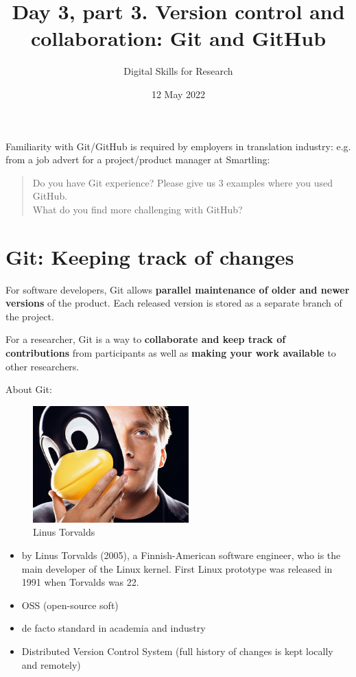 \documentclass[a4paper,11pt]{article}
\title{Day 3, part 3. Version control and collaboration: Git and GitHub}
\author{Digital Skills for Research}
\date{12 May 2022}
\begin{document}
	
	\clearpage
	\maketitle
	\thispagestyle{empty}
	
	\tableofcontents 

\section*{}

Familiarity with Git/GitHub is required by employers in translation industry:
e.g. from a job advert for a project/product manager at Smartling:
\begin{quotation}
	\noindent Do you have Git experience? Please give us 3 examples where you used GitHub.\\
	What do you find more challenging with GitHub?
\end{quotation}


\section{Git: Keeping track of changes}

For software developers, Git allows \textbf{parallel maintenance of older and newer versions} of the product. Each released version is stored as a separate branch of the project. 

For a researcher, Git is a way to \textbf{collaborate and keep track of contributions} from participants as well as \textbf{making your work available} to other researchers. 

\bigskip

About Git:
\begin{figure}
	\centering
	\includegraphics[width=60mm]{pics/linux_git_creator_torvalds.jpg}
	\caption{Linus Torvalds}
\end{figure}
\begin{itemize}
	\item by Linus Torvalds (2005), a Finnish-American software engineer, who is the main developer of the Linux kernel. First Linux prototype was released in 1991 when Torvalds was 22.
	\item OSS (open-source soft)
	\item de facto standard in academia and industry
	\item Distributed Version Control System (full history of changes is kept locally and remotely)	
\end{itemize}
\end{document}
